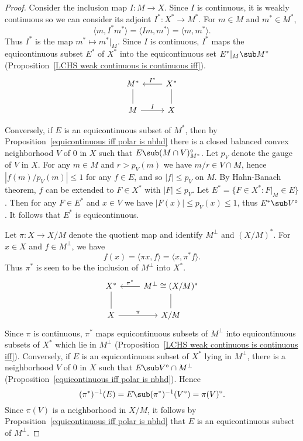 \begin{proof}
Consider the inclusion map $I:M\to X$. Since $I$ is continuous, it is weakly continuous so we can consider its adjoint $I^*:X^*\to M^*$. For $m\in M$ and $m^*\in M^*$,
\[\langle m,I^*m^*\rangle=\langle Im,m^*\rangle=\langle m,m^*\rangle.\]
Thus $I^*$ is the map $m^*\mapsto m^*|_M$. Since $I$ is continuous, $I^*$ maps the equicontinuous subset $E^*$ of $X^*$ into the equicontinuous set $E^*|_M\sub M^*$ (Proposition~\ref{LCHS weak continuous is continuous iff}).
\[\begin{tikzcd}
M^*\ar[d,no head]&X^*\ar[l,swap,"I^*"]\ar[d,no head]\\
M\ar[r,"I"]&X
\end{tikzcd}\]

Conversely, if $E$ is an equicontinuous subset of $M^*$, then by Proposition~\ref{equicontinuous iff polar is nbhd} there is a closed balanced convex neighborhood $V$ of $0$ in $X$ such that $E\sub (M\cap V)^\circ_{M^*}$. Let $p_V$ denote the gauge of $V$ in $X$. For any $m\in M$ and $r>p_V(m)$ we have $m/r\in V\cap M$, hence $|f(m)/p_V(m)|\leq 1$ for any $f\in E$, and so $|f|\leq p_V$ on $M$. By Hahn-Banach theorem, $f$ can be extended to $F\in X^*$ with $|F|\leq p_V$. Let $E^*=\{F\in X^*:F|_M\in E\}$. Then for any $F\in E^*$ and $x\in V$ we have $|F(x)|\leq p_V(x)\leq 1$, thus $E^*\sub V^\circ$. It follows that $E^*$ is equicontinuous.\par
Let $\pi:X\to X/M$ denote the quotient map and identify $M^\bot$ and $(X/M)^*$. For $x\in X$ and $f\in M^\bot$, we have
\[f(x)=\langle\pi x,f\rangle=\langle x,\pi^*f\rangle.\]
Thus $\pi^*$ is seen to be the inclusion of $M^\bot$ into $X^*$.
\[\begin{tikzcd}
X^*\ar[d,no head]&M^\bot\cong(X/M)^*\ar[l,swap,"\pi^*"]\ar[d,no head]\\
X\ar[r,"\pi"]&X/M
\end{tikzcd}\]
Since $\pi$ is continuous, $\pi^*$ maps equicontinuous subsets of $M^\bot$ into equicontinuous subsets of $X^*$ which lie in $M^\bot$ (Proposition~\ref{LCHS weak continuous is continuous iff}). Conversely, if $E$ is an equicontinuous subset of $X^*$ lying in $M^\bot$, there is a neighborhood $V$ of $0$ in $X$ such that $E\sub V^\circ\cap M^\bot$ (Proposition~\ref{equicontinuous iff polar is nbhd}). Hence
\[(\pi^*)^{-1}(E)=E\sub(\pi^*)^{-1}(V^\circ)=\pi(V)^\circ.\]
Since $\pi(V)$ is a neighborhood in $X/M$, it follows by Proposition~\ref{equicontinuous iff polar is nbhd} that $E$ is an equicontinuous subset of $M^\bot$. 
\end{proof}
